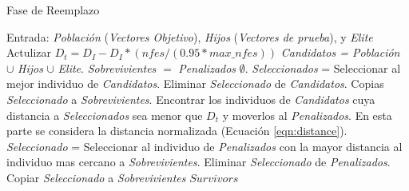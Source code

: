 \begin{algorithm}[t]
  \scriptsize
	\caption{Fase de Reemplazo} \label{alg:Replacement}
	\begin{algorithmic}[1]
	\STATE Entrada: \textit{Población} (\textit{Vectores Objetivo}), \textit{Hijos} (\textit{Vectores de prueba}), y \textit{Elite}
	\STATE Actulizar $D_t = D_I - D_I *(nfes/(0.95*max\_nfes)) $ 
	\STATE \textit{Candidatos = Población} $\cup$ \textit{Hijos} $\cup$ \textit{Elite}.
	\STATE \textit{Sobrevivientes} $=$ \textit{Penalizados} $\emptyset$.
	   \STATE \textit{Seleccionados} = Seleccionar al mejor individuo de \textit{Candidatos}.
		 \STATE Eliminar \textit{Seleccionado} de \textit{Candidatos}.
	   \STATE Copias \textit{Seleccionado} a \textit{Sobrevivientes}.
	   \STATE Encontrar los individuos de \textit{Candidatos} cuya distancia a \textit{Seleccionados} sea menor que $D_t$ y moverlos al \textit{Penalizados}. En esta parte se considera la distancia normalizada (Ecuación \ref{eqn:distance}).
	\ENDWHILE
	   \STATE \textit{Seleccionado} = Seleccionar al individuo de \textit{Penalizados} con la mayor distancia al individuo mas cercano a \textit{Sobrevivientes}.
		 \STATE Eliminar \textit{Seleccionado} de \textit{Penalizados}.
	   \STATE Copiar \textit{Seleccionado} a \textit{Sobrevivientes}
	\ENDWHILE
  \RETURN $Survivors$
\end{algorithmic}
\end{algorithm}

